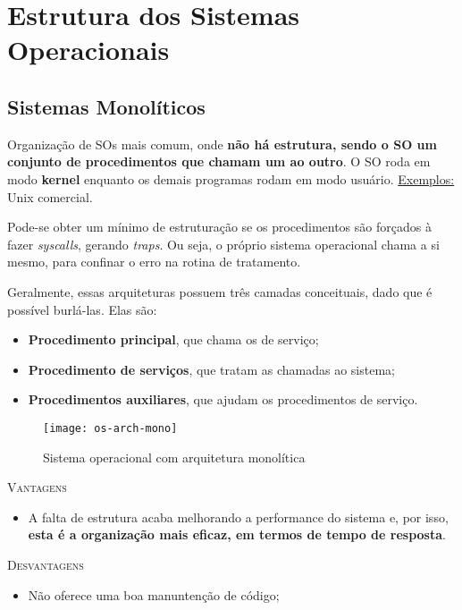 \section {Estrutura dos Sistemas Operacionais}

\subsection{Sistemas Monolíticos}
Organização de SOs mais comum, onde \textbf{não há estrutura, sendo o SO um conjunto de procedimentos que chamam um ao outro}. O SO roda em modo \textbf{kernel} enquanto os demais programas rodam em modo usuário.
\underline{Exemplos:} Unix comercial.

Pode-se obter um mínimo de estruturação se os procedimentos são forçados à fazer \textit{syscalls}, gerando \textit{traps}. Ou seja, o próprio sistema operacional chama a si mesmo, para confinar o erro na rotina de tratamento.

Geralmente, essas arquiteturas possuem três camadas conceituais, dado que é possível burlá-las. Elas são:
\begin{itemize}
  \item \textbf{Procedimento principal}, que chama os de serviço;
  \item \textbf{Procedimento de serviços}, que tratam as chamadas ao sistema;
  \item \textbf{Procedimentos auxiliares}, que ajudam os procedimentos de serviço.
\end{itemize}

\begin{figure}[ht]
  \centering
  \texttt{[image: os-arch-mono]}
  \caption{Sistema operacional com arquitetura monolítica}
  \label{fig:os-arch-mono}
\end{figure}

\textsc{Vantagens}
\begin{itemize}
  \item A falta de estrutura acaba melhorando a performance do sistema e, por isso, \textbf{esta é a organização mais eficaz, em termos de tempo de resposta}.
\end{itemize}

\textsc{Desvantagens}
\begin{itemize}
  \item Não oferece uma boa manuntenção de código;
\end{itemize}







